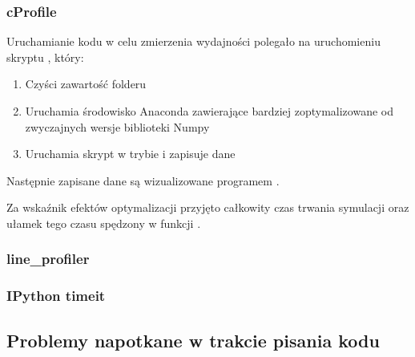    \subsubsection{cProfile}
    Uruchamianie kodu w celu zmierzenia wydajności polegało na uruchomieniu skryptu , który:
    \begin{enumerate}
    \item Czyści zawartość folderu 
    \item Uruchamia środowisko Anaconda zawierające bardziej zoptymalizowane od zwyczajnych wersje biblioteki Numpy
    \item Uruchamia skrypt  w trybie  i zapisuje dane
    \end{enumerate}

    Następnie zapisane dane są wizualizowane programem .

    Za wskaźnik efektów optymalizacji przyjęto całkowity czas trwania symulacji oraz ułamek tego czasu spędzony w funkcji
    .
    \subsubsection{line\_profiler}
    \subsubsection{IPython timeit}

    \subsection{Problemy napotkane w trakcie pisania kodu} %
